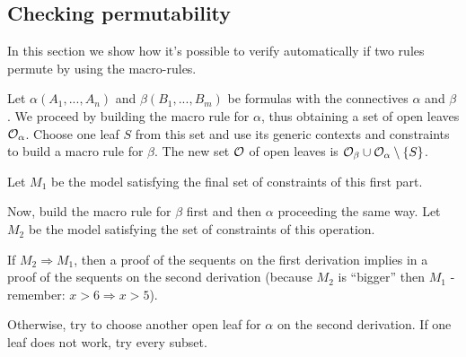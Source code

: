 \subsection{Checking permutability}

In this section we show how it's possible to verify automatically if two rules
permute by using the macro-rules.

\begin{giselle}
Let $\alpha(A_1, ..., A_n)$ and $\beta(B_1, ..., B_m)$ be formulas with the
connectives $\alpha$ and $\beta$. We proceed by building the macro rule for
$\alpha$, thus obtaining a set of open leaves $\mathcal{O}_{\alpha}$. Choose one leaf
$S$ from this set and use its generic contexts and constraints to build a macro rule
for $\beta$. The new set $\mathcal{O}$ of open leaves is $\mathcal{O}_{\beta} \cup
\mathcal{O}_{\alpha} \setminus \{S\}$.

Let $M_1$ be the model satisfying the final set of constraints of this first
part.

Now, build the macro rule for $\beta$ first and then $\alpha$ proceeding the
same way. Let $M_2$ be the model satisfying the set of constraints of this
operation.

If $M_2 \Rightarrow M_1$, then a proof of the sequents on the first derivation
implies in a proof of the sequents on the second derivation (because $M_2$ is
``bigger'' then $M_1$ - remember: $x > 6 \Rightarrow x > 5$).

Otherwise, try to choose another open leaf for $\alpha$ on the second
derivation. If one leaf does not work, try every subset.
\end{giselle}

